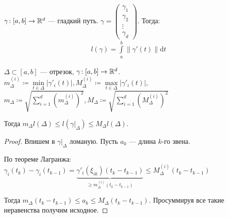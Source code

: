 \begin{theorem}
    $\gamma\!: [a,b] \to \mathbb{R}^d$ --- гладкий путь. $\gamma = \begin{pmatrix} \gamma_1 \\ \gamma_2 \\ \vdots \\ \gamma_d \end{pmatrix}$. Тогда: 
\begin{align*}
    l(\gamma) = \int\limits_a^b \| \gamma'(t) \| \mathrm{d}t
\end{align*}
\end{theorem}
\begin{lemma}
    $\Delta \subset [a, b]$ --- отрезок, $\gamma\!: [a, b] \to \mathbb{R}^d$.  $m_\Delta^{(i)} \coloneqq \min\limits_{t \in \Delta}|\gamma'_i(t)|, M_\Delta^{(i)} \coloneqq \max\limits_{t \in \Delta}|\gamma'_i(t)|$, $m_\Delta \coloneqq \sqrt{\sum\limits_{i=1}^d (m_\Delta^{(i)})^2}, M_\Delta \coloneqq \sqrt{\sum\limits_{i=1}^d (M_\Delta^{(i)})^2}$

    Тогда $m_\Delta l(\Delta) \le l(\gamma \Big|_\Delta) \le M_\Delta l(\Delta)$.
\end{lemma}
\begin{proof}
    Впишем в $\gamma \Big|_\Delta$ ломаную. Пусть  $a_k$ --- длина  $k$-го звена.

    По теореме Лагранжа:  $\gamma_i(t_k) - \gamma_i(t_{k-1}) = \underbrace{\gamma'_i(\xi_{ik})(t_k - t_{k-1})}_{\ge m_\Delta^{(i)}(t_k - t_{k-1})} \le M_\Delta^{(i)} (t_k - t_{k-1})$

    Тогда $m_\Delta (t_k - t_{k-1}) \le a_k \le M_\Delta(t_k - t_{k-1})$. Просуммируя все такие неравенства получим исходное.
\end{proof}
